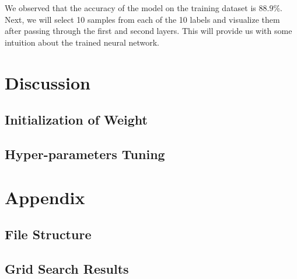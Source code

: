 \documentclass[10pt,a4paper,twoside]{tau}
\begin{document}
We observed that the accuracy of the model on the training dataset is $88.9\%$. Next, we will select 10 samples from each of the 10 labels and visualize them after passing through the first and second layers. This will provide us with some intuition about the trained neural network.



\section{Discussion}

\subsection{Initialization of Weight}

\subsection{Hyper-parameters Tuning}

\newpage
\renewcommand{\thesubsection}{\Alph{subsection}} 

\section{Appendix}
\subsection{File Structure}

\subsection{Grid Search Results}
\end{document}
